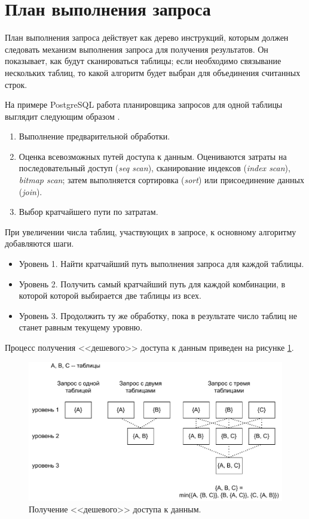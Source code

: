 \section{План выполнения запроса}
План выполнения запроса действует как дерево инструкций, которым должен следовать механизм выполнения запроса для получения результатов. Он показывает, как будут сканироваться таблицы; если необходимо связывание нескольких таблиц, то какой алгоритм будет выбран для объединения считанных строк.

На примере PostgreSQL работа планировщика запросов для одной таблицы выглядит следующим образом \cite{plan_query_postgres}.
\begin{enumerate}
	\item Выполнение предварительной обработки. 
	\item Оценка всевозможных путей доступа к данным. Оцениваются затраты на последовательный доступ (\textit{seq scan}), сканирование индексов (\textit{index scan}), \textit{bitmap scan}; затем выполняется сортировка (\textit{sort}) или присоединение данных (\textit{join}).
	\item Выбор кратчайшего пути по затратам.
\end{enumerate}

При увеличении числа таблиц, участвующих в запросе, к основному алгоритму добавляются шаги.
\begin{itemize}
	\item Уровень 1. Найти кратчайший путь выполнения запроса для каждой таблицы.
	\item Уровень 2. Получить самый кратчайший путь для каждой комбинации, в которой которой выбирается две таблицы из всех.
	\item Уровень 3. Продолжить ту же обработку, пока в результате число таблиц не станет равным текущему уровню.
\end{itemize}

Процесс получения <<дешевого>> доступа к данным приведен на рисунке \ref{image:data_access}.
\begin{figure}[H]
	\centering
	{
		\includegraphics[scale=0.8]{./images/postgre_plan.pdf}
		\caption{Получение <<дешевого>> доступа к данным.}
		\label{image:data_access}
	}
\end{figure}

